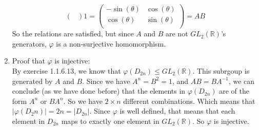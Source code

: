 \documentclass{article}
\newcommand{\R}{\mathbb{R}}
\begin{document}
\begin{enumerate}[label=\textbf{\alph*.}]
\[{\begin{pmatrix}
            \end{pmatrix}}{1} 
            = \begin{pmatrix}
                -\sin(\theta) & \cos(\theta) \\
                \cos(\theta) & \sin(\theta) \\
            \end{pmatrix} = AB \]
            So the relations are satisfied,
            but since $A$ and $B$ are not $GL_2(\R)$'s generators,
            $\varphi$ is a non-surjective homomorphism.
        \item
            Proof that $\varphi$ is injective: \\
            By exercise 1.1.6.13,
            we know that $\varphi(D_{2n}) \leqslant GL_2(\R)$.
            This subrgoup is generated by $A$ and $B$.
            Since we have $A^n = B^2 = 1$,
            and $AB = BA^{-1}$,
            we can conclude (as we have done before)
            that the elements in $\varphi(D_{2n})$
            are of the form $A^n$ or $BA^n$.
            So we have $2 \times n$ different combinations.
            Which means that $|\varphi(D_2n)| = 2n = |D_{2n}|$.
            Since $\varphi$ is well defined,
            that means that each element in $D_{2n}$ maps to exactly
            one element in $GL_2(\R)$.
            So $\varphi$ is injective.
    \end{enumerate}

    
\end{document}
